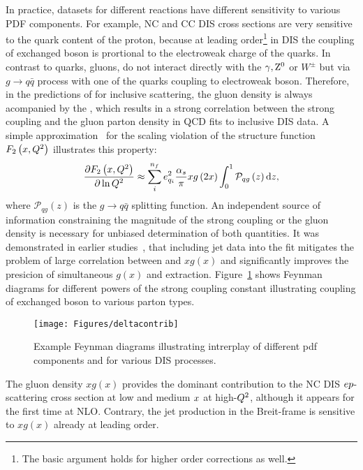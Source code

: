 In practice, datasets for different reactions have different sensitivity to various PDF components. For example, NC and CC DIS cross sections are very sensitive to the quark content of the proton, because at leading order\footnote{The basic argument holds for higher order corrections as well.} in DIS the coupling of exchanged boson is prortional to the electroweak charge of the quarks. In contrast to quarks, gluons, do not interact directly with the $\gamma,\mbox{$\rm{Z}^0$}$ or $W^{\pm}$ but via $g\rightarrow q\bar q$ process with one of the quarks coupling to electroweak boson. Therefore, in the predictions of for inclusive \ep scattering, the gluon density is always acompanied by the \as, which results in a strong correlation between the strong coupling and the gluon parton density in QCD fits to inclusive DIS data. A simple approximation~\cite{Prytz:1993vr} for the scaling violation of the structure function $F_2\left(x,\mbox{${Q^2}$} \right)$ illustrates this property:
\begin{equation}
 \frac{\partial F_2\left(x,\mbox{${Q^2}$} \right)}{\partial \ln \mbox{${Q^2}$}} \approx \sum_i^{n_f}e_{q_i}^2 \frac{\mbox{$\alpha_{s}$}}{\pi} xg\left(2x\right) \int_0^1 \mathcal{P}_{qg}\left(z\right)\mathrm{d}z, 
\end{equation}
where $\mathcal{P}_{qg}\left(z\right)$ is the $g\rightarrow q\bar q$ splitting function. An independent source of information constraining the magnitude of the strong coupling or the gluon density is necessary for unbiased determination of both quantities. It was demonstrated in earlier studies~\cite{Chekanov:2005nn,H1prelim-11-143,ZEUS-prel-11-010}, that including jet data into the fit mitigates the problem of large correlation between \as and $xg\left(x\right)$ and significantly improves the presicion of simultaneous $g\left(x\right)$ and \as extraction. Figure~\ref{fig:pdfcontributions} shows Feynman diagrams for different powers of the strong coupling constant illustrating coupling of exchanged boson to various parton types.
\begin{figure}[htp]
 \centering
 \begin{center}
 \texttt{[image: Figures/deltacontrib]}
\end{center}
 \caption{Example Feynman diagrams illustrating intrerplay of different pdf components and \as for various DIS processes.}
 \label{fig:pdfcontributions}
\end{figure}

The gluon density $xg\left(x\right)$ provides the dominant contribution to the NC DIS $\mbox{$e p$}$-scattering cross section at low and medium $\mbox{${x}$}$ at high-$\mbox{${Q^2}$}$, although it appears for the first time at NLO. Contrary, the jet production in the Breit-frame is sensitive to $xg\left(x\right)$ already at leading order.

